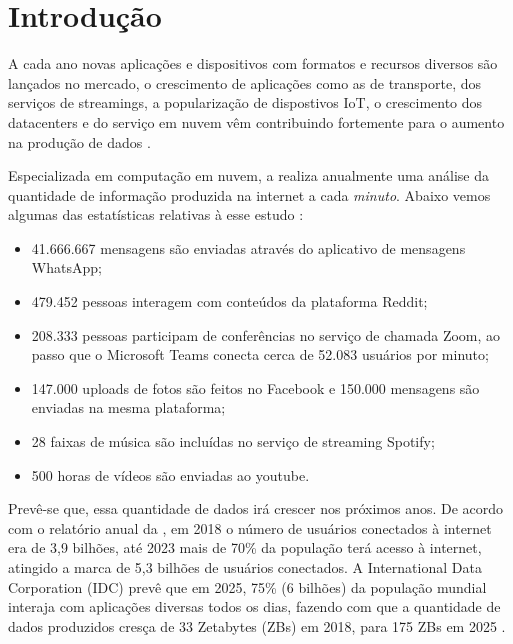 \chapter{Introdução}
\label{chp:introduction}

A cada ano novas aplicações e dispositivos com formatos e recursos diversos são lançados no mercado, o crescimento de aplicações como as de transporte, dos serviços de streamings, a popularização de  dispostivos IoT, o crescimento dos datacenters e do serviço em nuvem vêm contribuindo fortemente para o aumento na produção de dados \citep{relatorio-idc}.

Especializada em computação em nuvem, a \citeauthor{domo-study} realiza anualmente uma análise da quantidade de informação produzida na internet  a cada \textit{minuto}. Abaixo vemos algumas das estatísticas relativas à esse estudo \citep{domo-study}:

\begin{itemize}
    \item 41.666.667 mensagens são enviadas através do aplicativo de mensagens WhatsApp;
    \item 479.452 pessoas interagem com conteúdos da plataforma Reddit;
    \item 208.333 pessoas participam de conferências no serviço de chamada Zoom, ao passo que o Microsoft Teams conecta cerca de 52.083 usuários por minuto;
    \item 147.000 uploads de fotos são feitos no Facebook e 150.000 mensagens são enviadas na mesma plataforma;
    \item 28 faixas de música são incluídas no serviço de streaming Spotify;
    \item 500 horas de vídeos são enviadas ao youtube.
\end{itemize}

Prevê-se que, essa quantidade de dados irá crescer nos próximos anos. De acordo com o relatório anual da \citet{relatorio-cisco}, em 2018 o número de usuários conectados à internet era de 3,9 bilhões, até 2023 mais de 70\% da população terá acesso à internet, atingido a marca de 5,3 bilhões de usuários conectados. A International Data Corporation (IDC) prevê que em 2025, 75\% (6 bilhões) da população mundial interaja com aplicações diversas todos os dias, fazendo com que a quantidade de dados produzidos cresça de 33 Zetabytes (ZBs) em 2018, para 175 ZBs em 2025 \citep{relatorio-idc}.%

